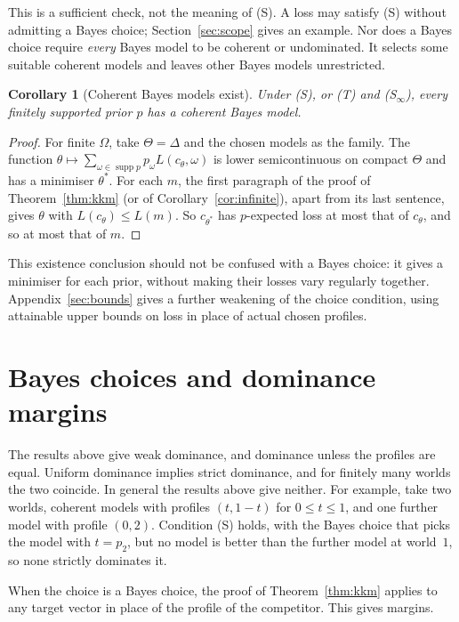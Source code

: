 \documentclass[11pt]{article}
\newtheorem{corollary}[theorem]{Corollary}
\theoremstyle{definition}
\theoremstyle{remark}
\newcommand{\supp}{\operatorname{supp}}
\begin{document}
This is a sufficient check, not the meaning of (S). A loss may satisfy (S) without admitting a Bayes choice; Section~\ref{sec:scope} gives an example. Nor does a Bayes choice require \emph{every} Bayes model to be coherent or undominated. It selects some suitable coherent models and leaves other Bayes models unrestricted.
\begin{corollary}[Coherent Bayes models exist]\label{cor:bayes}
Under (S), or (T) and (S$_\infty$), every finitely supported prior $p$ has a coherent Bayes model.
\end{corollary}
\begin{proof}
For finite $\Omega$, take $\Theta=\Delta$ and the chosen models as the family. The function $\theta\mapsto\sum_{\omega\in\supp p}p_\omega L(c_\theta,\omega)$ is lower semicontinuous on compact $\Theta$ and has a minimiser $\theta^*$. For each $m$, the first paragraph of the proof of Theorem~\ref{thm:kkm} (or of Corollary~\ref{cor:infinite}), apart from its last sentence, gives $\theta$ with $L(c_\theta)\le L(m)$. So $c_{\theta^*}$ has $p$-expected loss at most that of $c_\theta$, and so at most that of $m$.
\end{proof}

This existence conclusion should not be confused with a Bayes choice: it gives a minimiser for each prior, without making their losses vary regularly together. Appendix~\ref{sec:bounds} gives a further weakening of the choice condition, using attainable upper bounds on loss in place of actual chosen profiles.
\section{Bayes choices and dominance margins}\label{sec:strict}
The results above give weak dominance, and dominance unless the profiles are equal. Uniform dominance implies strict dominance, and for finitely many worlds the two coincide. In general the results above give neither. For example, take two worlds, coherent models with profiles $(t,1-t)$ for $0\le t\le1$, and one further model with profile $(0,2)$. Condition (S) holds, with the Bayes choice that picks the model with $t=p_2$, but no model is better than the further model at world~$1$, so none strictly dominates it.

When the choice is a Bayes choice, the proof of Theorem~\ref{thm:kkm} applies to any target vector in place of the profile of the competitor. This gives margins.
\end{document}
